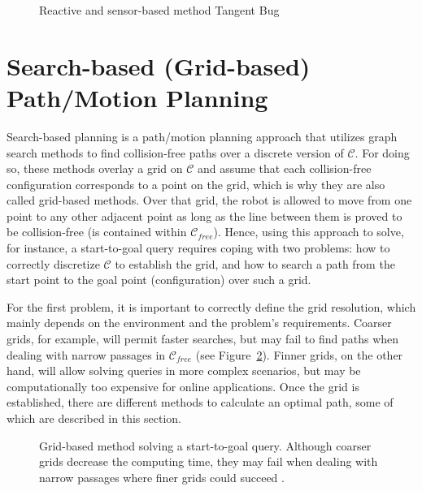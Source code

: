 \begin{figure}[htbp]
    \myfloatalign
     \quad
\caption[Reactive and sensor-based method Tangent Bug.]
{Reactive and sensor-based method Tangent Bug}
\label{fig:TangentBug}
\end{figure}

\section{Search-based (Grid-based) Path/Motion Planning}
\label{sec:SearchBased}

Search-based planning is a path/motion planning approach that utilizes graph
search methods to find collision-free paths over a discrete version of $\mathcal{C}$.
For doing so, these methods overlay a grid on $\mathcal{C}$ and assume that each
collision-free configuration corresponds to a point on the grid, which is why
they are also called grid-based methods. Over that grid, the robot is allowed to
move from one point to any other adjacent point as long as the line between them
is proved to be collision-free (\ie is contained within $\mathcal{C}_{free}$).
Hence, using this approach to solve, for instance, a start-to-goal query
requires coping with two problems: how to correctly discretize $\mathcal{C}$ to
establish the grid, and how to search a path from the start point to the goal
point (configuration) over such a grid.

For the first problem, it is important to correctly define the grid resolution,
which mainly depends on the environment and the problem's requirements. Coarser
grids, for example, will permit faster searches, but may fail to find paths when
dealing with narrow passages in $\mathcal{C}_{free}$ (see
Figure~\ref{fig:Grid-based}). Finner grids, on the other hand, will allow
solving queries in more complex scenarios, but may be computationally too
expensive for online applications. Once the grid is established, there are
different methods to calculate an optimal path, some of which are described in
this section.

\begin{figure}[htbp]
    \myfloatalign
     \quad
\caption[Grid-based method: coarse and fine grid.]
{Grid-based method solving a start-to-goal query.
\protect {} Although coarser grids
decrease the computing time, they may fail when dealing with narrow passages
where finer grids could succeed \protect
{}.}
\label{fig:Grid-based}
\end{figure}

